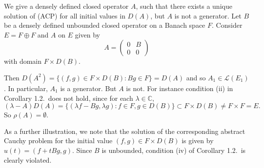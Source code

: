 \begin{example}\label{ex:1.4}
We give a densely defined closed operator $A$, such that there exists a unique solution of (ACP) for all initial values in $D(A)$, but $A$ is not a generator.
Let $B$ be a densely defined unbounded closed operator on a Banach space $F$.
Consider $E = F \oplus F$ and $A$ on $E$ given by
\[
A = \begin{pmatrix} 0 & B \\ 0 & 0 \end{pmatrix}
\]
with domain $F \times D(B)$.

Then $D(A^{2}) = \{(f,g) \in F \times D(B) : Bg \in F\} = D(A)$ and so $A_{1} \in \mathcal{L}(E_{1})$.
In particular, $A_{1}$ is a generator.
But $A$ is not.
For instance condition (ii) in Corollary 1.2.\ does not hold, since for each $\lambda \in \mathbb{C}$,
\[
(\lambda-A)D(A) = \{(\lambda f-Bg,\lambda g) : f \in F, g \in D(B)\} \subset F \times D(B) \neq F \times F = E.
\]
So $\rho(A) = \emptyset$.
\end{example}

As a further illustration, we note that the solution of the corresponding abstract Cauchy problem for the initial value $(f,g) \in F \times D(B)$ is given by $u(t) = (f + tBg,g)$.
Since $B$ is unbounded, condition (iv) of Corollary 1.2.\ is clearly violated.